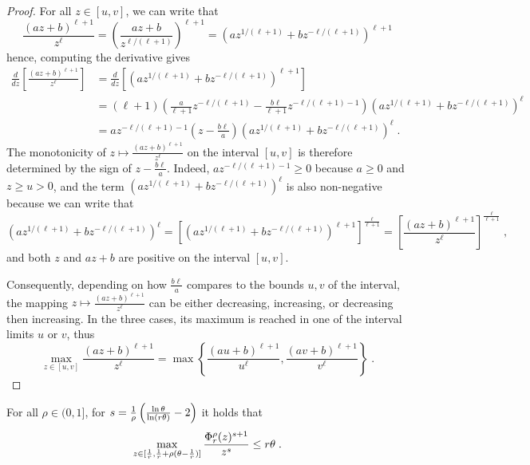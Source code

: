 \begin{proof}
For all $z \in [u,v]$, we can write that
\[
\frac{(az+b)^{\ell+1}}{z^\ell} 
= \left( \frac{az+b}{z^{\ell/(\ell+1)}}  \right)^{\ell + 1}
= \left( a z^{1/(\ell+1)} + b z^{-\ell/(\ell+1)} \right)^{\ell+1}
\]
hence, computing the derivative gives
\begin{align*}
\frac{d}{dz} \left[ \frac{(az+b)^{\ell+1}}{z^\ell} \right]
&= \frac{d}{dz} \left[ \left( a z^{1/(\ell+1)} + b z^{-\ell/(\ell+1)} \right)^{\ell+1}\right]\\
&= (\ell+1) \left( \frac{a}{\ell+1} z^{-\ell/(\ell+1)} - \frac{b\ell}{\ell+1} z^{-\ell/(\ell+1) - 1} \right) \left( a z^{1/(\ell+1)} + b z^{-\ell/(\ell+1)} \right)^{\ell}\\
&= a z^{-\ell/(\ell+1)-1} \left( z - \frac{b\ell}{a}  \right) \left( a z^{1/(\ell+1)} + b z^{-\ell/(\ell+1)} \right)^{\ell}\;.
\end{align*}
The monotonicity of $z \mapsto \frac{(az+b)^{\ell+1}}{z^\ell}$ on the interval $[u,v]$ is therefore determined by the sign of $z-\frac{b\ell}{a}$. Indeed, $az^{-\ell/(\ell+1)-1} \geq 0$ because $a \geq 0$ and $z \geq u > 0$, and the term $\left( a z^{1/(\ell+1)} + b z^{-\ell/(\ell+1)} \right)^{\ell}$ is also non-negative because we can write that
\[
\left( a z^{1/(\ell+1)} + b z^{-\ell/(\ell+1)} \right)^{\ell}
= \left[ \left( a z^{1/(\ell+1)} + b z^{-\ell/(\ell+1)} \right)^{\ell+1} \right]^{\frac{\ell}{\ell+1}}
= \left[ \frac{(az+b)^{\ell+1}}{z^\ell}\right]^{\frac{\ell}{\ell+1}}\;,
\]
and both $z$ and $az+b$ are positive on the interval $[u,v]$.

Consequently, depending on how $\frac{b\ell}{a}$ compares to the bounds $u,v$ of the interval, the mapping $z \mapsto \frac{(az+b)^{\ell+1}}{z^\ell}$ can be either decreasing, increasing, or decreasing then increasing. In the three cases, its maximum is reached in one of the interval limits $u$ or $v$, thus
\[
\max_{z \in [u,v]} \frac{(az+b)^{\ell+1}}{z^\ell} 
= \max \left\{ \frac{(au+b)^{\ell+1}}{u^\ell}, \frac{(av+b)^{\ell+1}}{v^\ell} \right\}\;.
\]
\end{proof}




\begin{corollary}\label{cor:max-thresh/z<rub}
For all $\rho \in (0,1]$, for $s = \frac{1}{\rho}\left( \frac{\ln \theta}{\ln (r \theta)} - 2 \right)$ it holds that
\[
\max_{z \in [\frac{1}{r}, \frac{1}{r}+\rho(\theta-\frac{1}{r})]} \frac{\Phi^\rho_r(z)^{s+1}}{z^{s}} \leq r \theta\;.
\]
\end{corollary}


